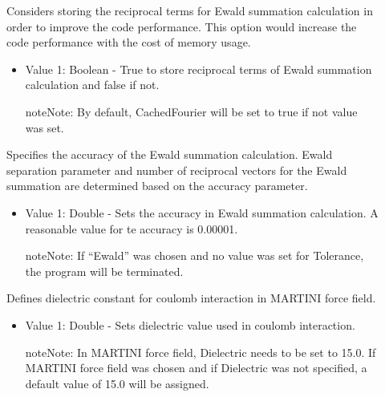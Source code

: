 \documentclass[letterpaper,10pt,english]{sphinxmanual}
\begin{document}
\begin{description}
\item[{}] \leavevmode
Considers storing the reciprocal terms for Ewald summation calculation in order to improve the code performance. This option would increase the code performance with the cost of memory usage.
\begin{itemize}
\item {} 
Value 1: Boolean - True to store reciprocal terms of Ewald summation calculation and false if not.

\begin{sphinxadmonition}{note}{Note:}
By default, CachedFourier will be set to true if not value was set.
\end{sphinxadmonition}

\end{itemize}

\item[{}] \leavevmode
Specifies the accuracy of the Ewald summation calculation. Ewald separation parameter and number of reciprocal vectors for the Ewald summation are determined based on the accuracy parameter.
\begin{itemize}
\item {} 
Value 1: Double - Sets the accuracy in Ewald summation calculation. A reasonable value for te accuracy is 0.00001.

\begin{sphinxadmonition}{note}{Note:}
If “Ewald” was chosen and no value was set for Tolerance, the program will be terminated.
\end{sphinxadmonition}

\end{itemize}

\item[{}] \leavevmode
Defines dielectric constant for coulomb interaction in MARTINI force field.
\begin{itemize}
\item {} 
Value 1: Double - Sets dielectric value used in coulomb interaction.

\begin{sphinxadmonition}{note}{Note:}
In MARTINI force field, Dielectric needs to be set to 15.0. If MARTINI force field was chosen and if Dielectric was not specified, a default value of 15.0 will be assigned.
\end{sphinxadmonition}

\end{itemize}


\end{description}
\end{document}
